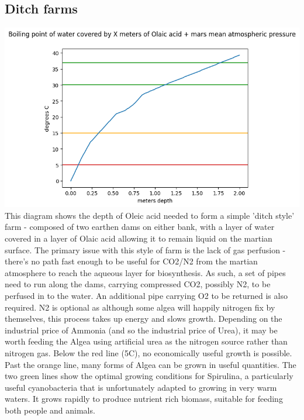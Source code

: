 \documentclass[10pt]{article}
\begin{document}
\subsection{Ditch farms}
\includegraphics{fig_bp.png}
This diagram shows the depth of Oleic acid needed to form a simple 'ditch style' farm - composed of two earthen dams on either bank, with a layer of water covered in a layer of Olaic acid allowing it to remain liquid on the martian surface. The primary issue with this style of farm is the lack of gas perfusion - there's no path fast enough to be useful for CO2/N2 from the martian atmosphere to reach the aqueous layer for biosynthesis. As such, a set of pipes need to run along the dams, carrying compressed CO2, possibly N2, to be perfused in to the water. An additional pipe carrying O2 to be returned is also required. N2 is optional as although some algea will happily nitrogen fix by themselves, this process takes up energy and slows growth. Depending on the industrial price of Ammonia (and so the industrial price of Urea), it may be worth feeding the Algea using artificial urea as the nitrogen source rather than nitrogen gas. Below the red line (5C), no economically useful growth is possible. Past the orange line, many forms of Algea can be grown in useful quantities. The two green lines show the optimal growing conditions for Spirulina, a particularly useful cyanobacteria that is unfortunately adapted to growing in very warm waters. It grows rapidly to produce nutrient rich biomass, suitable for feeding both people and animals. 
\end{document}
